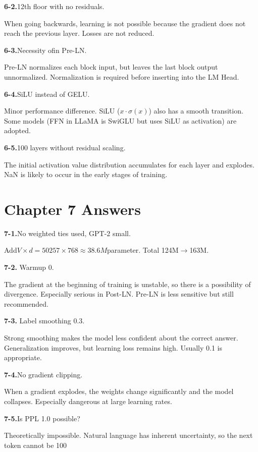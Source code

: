 \textbf{6-2.}12th floor with no residuals.

When going backwards, learning is not possible because the gradient does not reach the previous layer. Losses are not reduced.

\textbf{6-3.}Necessity ofin Pre-LN.

Pre-LN normalizes each block input, but leaves the last block output unnormalized. Normalization is required before inserting into the LM Head.

\textbf{6-4.}SiLU instead of GELU.

Minor performance difference. SiLU ($x \cdot \sigma(x)$) also has a smooth transition. Some models (FFN in LLaMA is SwiGLU but uses SiLU as activation) are adopted.

\textbf{6-5.}100 layers without residual scaling.

The initial activation value distribution accumulates for each layer and explodes. NaN is likely to occur in the early stages of training.

\section{Chapter 7 Answers}

\textbf{7-1.}No weighted ties used, GPT-2 small.

Add$V \times d = 50257 \times 768 \approx 38.6M$parameter. Total 124M$\to$163M.

\textbf{7-2.} Warmup 0.

The gradient at the beginning of training is unstable, so there is a possibility of divergence. Especially serious in Post-LN. Pre-LN is less sensitive but still recommended.

\textbf{7-3.} Label smoothing 0.3.

Strong smoothing makes the model less confident about the correct answer. Generalization improves, but learning loss remains high. Usually 0.1 is appropriate.

\textbf{7-4.}No gradient clipping.

When a gradient explodes, the weights change significantly and the model collapses. Especially dangerous at large learning rates.

\textbf{7-5.}Is PPL 1.0 possible?

Theoretically impossible. Natural language has inherent uncertainty, so the next token cannot be 100%

